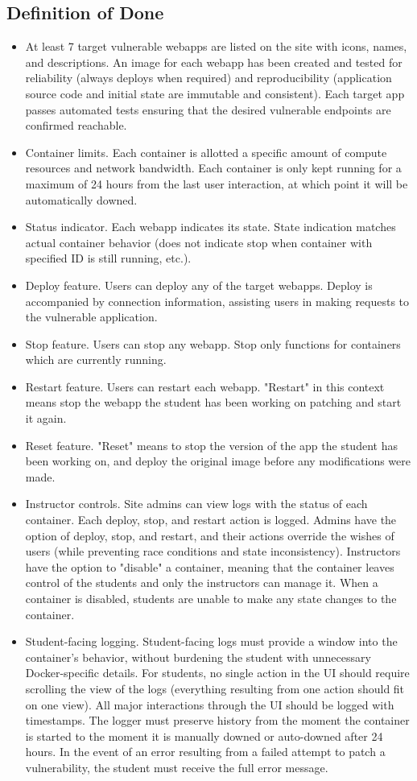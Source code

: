 \documentclass[12pt]{article}
\begin{document}
\subsection{Definition of Done}
\begin{itemize}
	\item At least 7 target vulnerable webapps are listed on the site with icons, names, and descriptions. An image for each webapp has been created and tested for reliability (always deploys when required) and reproducibility (application source code and initial state are immutable and consistent). Each target app passes automated tests ensuring that the desired vulnerable endpoints are confirmed reachable.
	\item Container limits. Each container is allotted a specific amount of compute resources and network bandwidth. Each container is only kept running for a maximum of 24 hours from the last user interaction, at which point it will be automatically downed.
	\item Status indicator. Each webapp indicates its state. State indication matches actual container behavior (does not indicate stop when container with specified ID is still running, etc.).
	\item Deploy feature. Users can deploy any of the target webapps. Deploy is accompanied by connection information, assisting users in making requests to the vulnerable application.
	\item Stop feature. Users can stop any webapp. Stop only functions for containers which are currently running.
	\item Restart feature. Users can restart each webapp. "Restart" in this context means stop the webapp the student has been working on patching and start it again.
	\item Reset feature. "Reset" means to stop the version of the app the student has been working on, and deploy the original image before any modifications were made.
	\item Instructor controls. Site admins can view logs with the status of each container. Each deploy, stop, and restart action is logged. Admins have the option of deploy, stop, and restart, and their actions override the wishes of users (while preventing race conditions and state inconsistency). Instructors have the option to "disable" a container, meaning that the container leaves control of the students and only the instructors can manage it. When a container is disabled, students are unable to make any state changes to the container.
	\item Student-facing logging. Student-facing logs must provide a window into the container's behavior, without burdening the student with unnecessary Docker-specific details. For students, no single action in the UI should require scrolling the view of the logs (everything resulting from one action should fit on one view). All major interactions through the UI should be logged with timestamps. The logger must preserve history from the moment the container is started to the moment it is manually downed or auto-downed after 24 hours. In the event of an error resulting from a failed attempt to patch a vulnerability, the student must receive the full error message.

\end{itemize}
\end{document}
